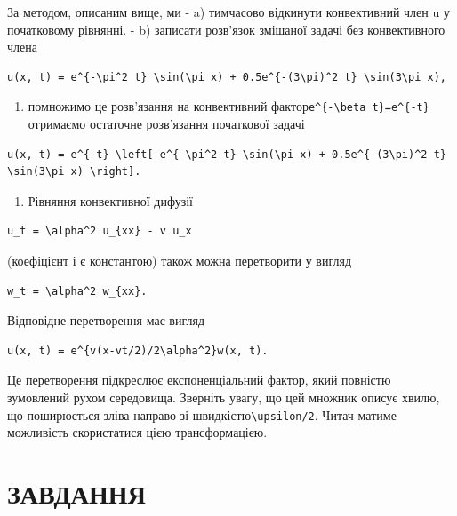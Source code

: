 \documentclass[
  ukrainian,
]{article}
\providecommand{\tightlist}{%
  \setlength{\itemsep}{0pt}\setlength{\parskip}{0pt}}
\begin{document}
За методом, описаним вище, ми - a) тимчасово відкинути конвективний член
u у початковому рівнянні. - b) записати розв'язок змішаної задачі без
конвективного члена

\begin{verbatim}
u(x, t) = e^{-\pi^2 t} \sin(\pi x) + 0.5e^{-(3\pi)^2 t} \sin(3\pi x),
\end{verbatim}

\begin{enumerate}
\def\labelenumi{\alph{enumi})}
\setcounter{enumi}{2}
\tightlist
\item
  помножимо це розв'язання на конвективний
  фактор\texttt{e\^{}\{-\textbackslash{}beta\ t\}=e\^{}\{-t\}}отримаємо
  остаточне розв'язання початкової задачі
\end{enumerate}

\begin{verbatim}
u(x, t) = e^{-t} \left[ e^{-\pi^2 t} \sin(\pi x) + 0.5e^{-(3\pi)^2 t} \sin(3\pi x) \right].
\end{verbatim}

\begin{enumerate}
\def\labelenumi{\arabic{enumi}.}
\setcounter{enumi}{1}
\tightlist
\item
  Рівняння конвективної дифузії
\end{enumerate}

\begin{verbatim}
u_t = \alpha^2 u_{xx} - v u_x
\end{verbatim}

(коефіцієнт і є константою) також можна перетворити у вигляд

\begin{verbatim}
w_t = \alpha^2 w_{xx}.
\end{verbatim}

Відповідне перетворення має вигляд

\begin{verbatim}
u(x, t) = e^{v(x-vt/2)/2\alpha^2}w(x, t).
\end{verbatim}

Це перетворення підкреслює експоненціальний фактор, який повністю
зумовлений рухом середовища. Зверніть увагу, що цей множник описує
хвилю, що поширюється зліва направо зі
швидкістю\texttt{\textbackslash{}upsilon/2}. Читач матиме можливість
скористатися цією трансформацією.

\section{ЗАВДАННЯ}\label{ux437ux430ux432ux434ux430ux43dux43dux44f-4}
\end{document}
